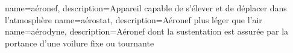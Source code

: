 {
    name=aéronef,
    description={Appareil capable de s'élever et de déplacer dans l'atmosphère}
}
{
    name=aérostat,
    description={Aéronef plus léger que l'air}
}
{
    name=aérodyne,
    description={Aéronef dont la sustentation est assurée par la portance d'une voilure fixe ou tournante}
}
